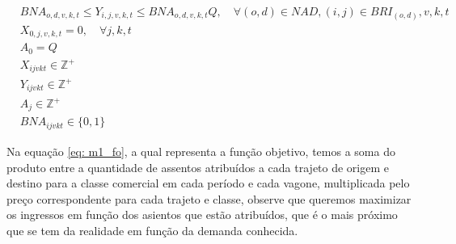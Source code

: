 \begin{align}      
	& BNA_{o,d,v,k,t} \leq Y_{i,j,v,k,t} \leq BNA_{o,d,v,k,t} Q, \quad  \forall (o,d)\in NAD, (i,j) \in BRI_{(o,d)}, v,k,t                                                                                           \label{eq: m1_autho_igualar_trecho_maior}  \\
	& X_{0,j,v,k,t} = 0,     \quad \forall j,k,t                                                                                                                                                                     \label{eq: m1_ini_assig}                   \\
	& A_{0} = Q                                                                                                                                                                                                      \label{eq: m1_ini_disponi}                 \\
	& X_{ijvkt} \in \mathbb{Z}^+                                                                                                                                                                                     \label{eq: m1_dom_assig}                   \\
	& Y_{ijvkt} \in \mathbb{Z}^+                                                                                                                                                                                     \label{eq: m1_dom_autho}                   \\
	& A_{j} \in \mathbb{Z}^+                                                                                                                                                                                         \label{eq: m1_dom_disponi}                 \\
	& BNA_{ijvkt} \in \{0,1\}                                                                                                                                                                                        \label{eq: m1_dom_bin_nadja}
\end{align}


Na equação \ref{eq: m1_fo}, a qual representa a função objetivo, temos a soma do produto entre a quantidade de assentos atribuídos a cada trajeto de origem e destino para a classe comercial em cada período e cada vagone, multiplicada pelo preço correspondente para cada trajeto e classe, observe que queremos maximizar os ingressos em função dos asientos que estão atribuídos, que é o mais próximo que se tem da realidade em função da demanda conhecida.

